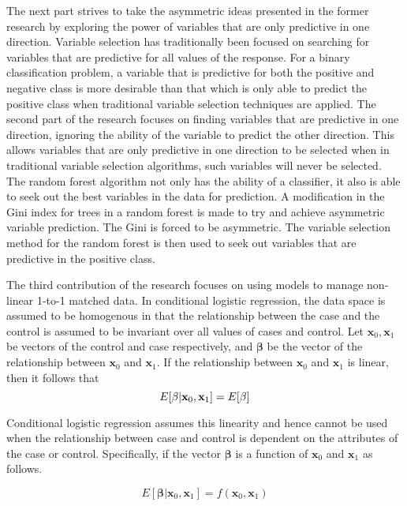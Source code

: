 The next part strives to take the asymmetric ideas presented in the former research by exploring the power of variables that are only predictive in one direction. Variable selection has traditionally been focused on searching for variables that are predictive for all values of the response. For a binary classification problem, a variable that is predictive for both the positive and negative class is more desirable than that which is only able to predict the positive class when traditional variable selection techniques are applied. The second part of the research focuses on finding variables that are predictive in one direction, ignoring the ability of the variable to predict the other direction. This allows variables that are only predictive in one direction to be selected when in traditional variable selection algorithms, such variables will never be selected. The random forest algorithm not only has the ability of a classifier, it also is able to seek out the best variables in the data for prediction. A modification in the Gini index  for trees in a random forest is made to try and achieve asymmetric variable prediction. The Gini is forced to be asymmetric. The variable selection method for the random forest is then used to seek out variables that are predictive in the positive class. 

The third contribution of the research focuses on using models to manage non-linear 1-to-1 matched data. In conditional logistic regression, the data space is assumed to be homogenous in that the relationship between the case and the control is assumed to be invariant over all values of cases and control. Let $\mathbf{x}_0,\mathbf{x}_1$ be vectors of the control and case respectively, and $\mathbf{\beta}$ be the vector of the relationship between  $\mathbf{x}_0$ and $\mathbf{x}_1$. If the relationship between $\mathbf{x}_0$ and $\mathbf{x}_1$ is linear, then it follows that 
\begin{equation}\label{eqn:linearrelationship}
	E[\mathbf{\beta}|\mathbf{x}_0,\mathbf{x}_1]=E[\mathbf{\beta}]\\
\end{equation}

Conditional logistic regression assumes this linearity and hence cannot be used when the relationship between case and control is dependent on the attributes of the case or control. Specifically, if the vector $\mathbf{\beta}$ is a function of $\mathbf{x}_0$ and $\mathbf{x}_1$ as follows. 

\begin{equation}\label{eqn:nonlinearrelationship}
	E[\mathbf{\beta}|\mathbf{x}_0,\mathbf{x}_1]=f(\mathbf{x}_0,\mathbf{x}_1)
\end{equation}


